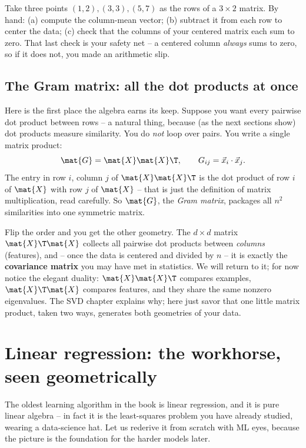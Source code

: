 \begin{labbox}
Take three points $(1,2),(3,3),(5,7)$ as the rows of a $3\times 2$ matrix. By hand:
(a) compute the column-mean vector; (b) subtract it from each row to center the data;
(c) check that the columns of your centered matrix each sum to zero. That last check is
your safety net -- a centered column \emph{always} sums to zero, so if it does not, you
made an arithmetic slip.
\end{labbox}

\subsection{The Gram matrix: all the dot products at once}

Here is the first place the algebra earns its keep. Suppose you want every pairwise dot
product between rows -- a natural thing, because (as the next sections show) dot products
measure similarity. You do \emph{not} loop over pairs. You write a single matrix product:
\[
\mat{G} = \mat{X}\mat{X}\T, \qquad G_{ij} = \vec{x}_i \cdot \vec{x}_j .
\]
The entry in row $i$, column $j$ of $\mat{X}\mat{X}\T$ is the dot product of row $i$ of
$\mat{X}$ with row $j$ of $\mat{X}$ -- that is just the definition of matrix
multiplication, read carefully. So $\mat{G}$, the \emph{Gram matrix}, packages all
$n^2$ similarities into one symmetric matrix.

Flip the order and you get the other geometry. The $d \times d$ matrix
$\mat{X}\T\mat{X}$ collects all pairwise dot products between \emph{columns} (features),
and -- once the data is centered and divided by $n$ -- it is exactly the
\textbf{covariance matrix} you may have met in statistics. We will return to it; for now
notice the elegant duality: $\mat{X}\mat{X}\T$ compares examples, $\mat{X}\T\mat{X}$
compares features, and they share the same nonzero eigenvalues. The SVD chapter explains
why; here just savor that one little matrix product, taken two ways, generates both
geometries of your data.

\section{Linear regression: the workhorse, seen geometrically}
\label{ch34:linreg}

The oldest learning algorithm in the book is linear regression, and it is pure linear
algebra -- in fact it is the least-squares problem you have already studied, wearing a
data-science hat. Let us rederive it from scratch with ML eyes, because the picture is
the foundation for the harder models later.

